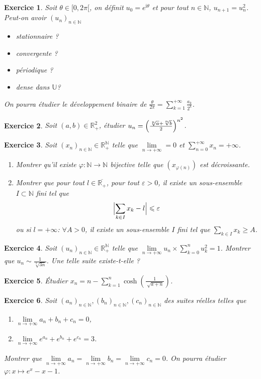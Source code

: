 \documentclass[12pt]{article}
\newtheorem{exercise}{Exercice}[section]
\theoremstyle{remark}
\theoremstyle{remark}
\newcommand{\R}{\mathbb{R}}
\newcommand{\N}{\mathbb{N}}
\newcommand{\U}{\mathbb{U}}
\begin{document}
\begin{exercise}
	Soit $\theta\in[0,2\pi[$, on définit $u_{0}=e^{\mathrm{i}\theta}$ et pour
	tout $n\in\N$, $u_{n+1}=u_{n}^{2}$. Peut-on avoir $(u_{n})_{n\in\N}$
	\begin{itemize}
		\item stationnaire ?
		\item convergente ?
		\item périodique ?
		\item dense dans $\U$?
	\end{itemize}
	On pourra étudier le développement binaire de
	$\frac{\theta}{2\pi}=\sum_{k=1}^{+\infty}\frac{a_{k}}{2^{k}}$.
\end{exercise}

\begin{exercise}
	Soit $(a,b)\in\R_{+}^{2}$, étudier $u_{n}=\Bigl(\frac{\sqrt[n]{a}+\sqrt[n]{b}}{2}\Bigr)^{n^{2}}$.
\end{exercise}

\begin{exercise}
	Soit $(x_{n})_{n\in\N}\in\R_{+}^{\N}$ telle que
	$\lim\limits_{n\to+\infty}=0$ et $\sum_{n=0}^{+\infty}x_{n}=+\infty$.
	\begin{enumerate}
		\item Montrer qu'il existe $\varphi:\N\to\N$ bijective telle que
		$(x_{\varphi(n)})$ est décroissante.
		\item Montrer que pour tout $l\in\overline{\R_{+}}$, pour tout
		$\varepsilon>0$, il existe un sous-ensemble $I\subset\N$ fini tel que
		$$\Bigl\vert\sum_{k\in I}x_{k}-l\Bigr\vert\leqslant\varepsilon$$
		ou si $l=+\infty$: $\forall A>0$, il existe un sous-ensemble $I$ fini
		tel que $\sum_{k\in I}x_{k}\geqslant A$.
	\end{enumerate}
\end{exercise}

\begin{exercise}
	Soit $(u_{n})_{n\in\N}\in\R_{+}^{\N}$ telle que
	$\lim\limits_{n\to+\infty}u_{n}\times\sum_{k=0}^{n}u_{k}^{2}=1$.
	Montrer que $u_{n}\sim\frac{1}{\sqrt[3]{3n}}$. Une telle suite existe-t-elle
	?
\end{exercise}

\begin{exercise}
	Étudier $x_{n}=n-\sum_{k=1}^{n}\cosh(\frac{1}{\sqrt[]{k+n}})$.
\end{exercise}

\begin{exercise}
	Soit $(a_{n})_{n\in\N},(b_{n})_{n\in\N},(c_{n})_{n\in\N}$ des suites réelles
	telles que 
	\begin{enumerate}
		\item [(i)] $\lim\limits_{n\to+\infty}a_{n}+b_{n}+c_{n}=0$,
		\item [(ii)] $\lim\limits_{n\to+\infty}e^{a_{n}}+e^{b_{n}}+e^{c_{n}}=3$.
	\end{enumerate}
	Montrer que
	$\lim\limits_{n\to+\infty}a_{n}=\lim\limits_{n\to+\infty}b_{n}=\lim\limits_{n\to+\infty}c_{n}=0$.
	On pourra étudier $\varphi:x\mapsto e^{x}-x-1$.
\end{exercise}
\end{document}
